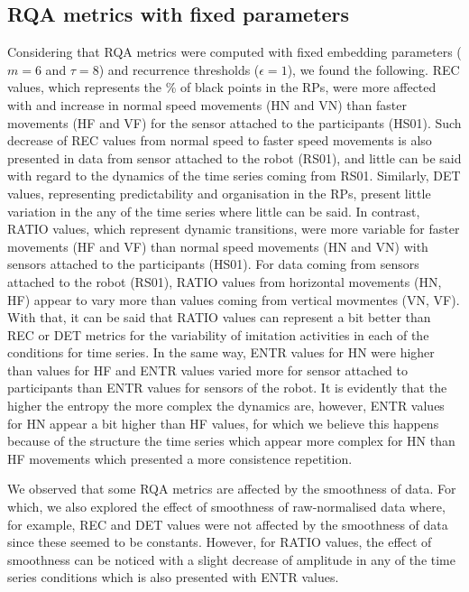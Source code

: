 \subsection{RQA metrics with fixed parameters}
Considering that RQA metrics were computed with fixed embedding parameters 
($m=6$ and $\tau=8$) and recurrence thresholds ($\epsilon=1$), we found the following.
REC values, which represents the \% of black points in the RPs, were more affected with 
and increase in normal speed movements (HN and VN) than faster movements (HF and VF)  
for the sensor attached to the participants (HS01). Such decrease of REC values 
from normal speed to faster speed movements is also presented in data from sensor 
attached to the robot (RS01), and little can be said with regard to the dynamics
of the time series coming from RS01. 
Similarly, DET values, representing predictability and organisation in the RPs, 
present little variation in the any of the time series where little can be said.
In contrast, RATIO values, which represent dynamic transitions, were more 
variable for faster movements (HF and VF) than normal speed movements (HN and VN) 
with sensors attached to the participants (HS01).
For data coming from sensors attached to the robot (RS01), RATIO values
from horizontal movements (HN, HF) appear to vary more than 
values coming from vertical movmentes (VN, VF).
With that, it can be said that RATIO values can represent a bit better
than REC or DET metrics for the variability of imitation activities in each of the conditions
for time series.
In the same way, ENTR values for HN were higher than values for HF
and ENTR values varied more for sensor attached to participants 
than ENTR values for sensors of the robot. It is evidently that 
the higher the entropy the more complex the dynamics are, 
however, ENTR values for HN appear a bit higher than HF values, 
for which we believe this happens because of the structure the time series
which appear more complex for HN than  HF movements which presented a 
more consistence repetition.

We observed that some RQA metrics are affected by the smoothness of data.
For which, we also explored the effect of smoothness of raw-normalised data 
where, for example, REC and DET values were not affected by the smoothness 
of data since these seemed to be constants. However, for RATIO values, 
the effect of smoothness can be noticed with a slight decrease of amplitude 
in any of the time series conditions which is also presented with ENTR values.


